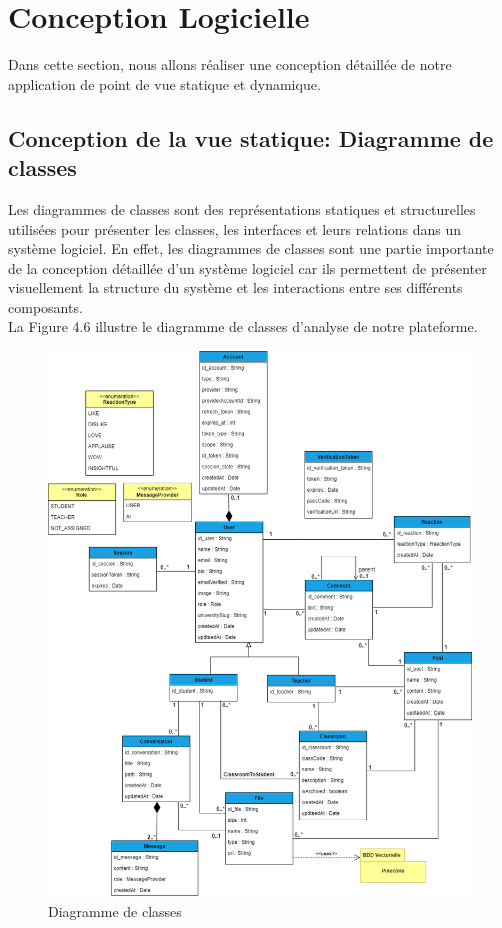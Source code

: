 \section{Conception Logicielle}
Dans cette section, nous allons réaliser une conception détaillée de notre application de point de vue statique et dynamique.

\subsection{Conception de la vue statique: Diagramme de classes}
Les diagrammes de classes sont des représentations statiques et structurelles utilisées pour présenter les classes, les interfaces et leurs relations dans un système logiciel. En effet, les diagrammes de classes sont une partie importante de la conception détaillée d'un système logiciel car ils permettent de présenter visuellement la structure du système et les interactions entre ses différents composants.\\
La Figure 4.6 illustre le diagramme de classes d’analyse de notre plateforme.

\begin{figure}[H]
    \centering
    \includegraphics[width=1.1\textwidth,height=1.45\textwidth]{images/chp4/fig6.png}
    \caption{Diagramme de classes}
    \label{fig:Diagramme de classes}    
\end{figure}

